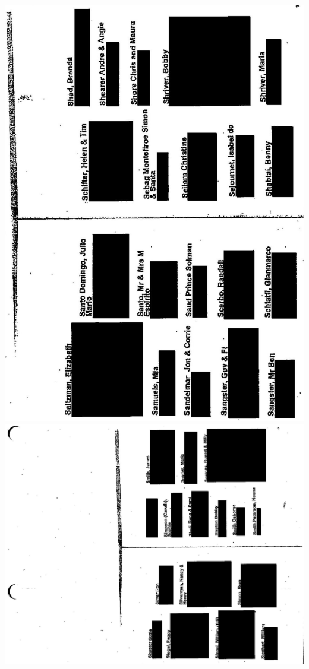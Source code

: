 \documentclass[10pt]{article}
\begin{document}
\includegraphics[max width=\textwidth, center]{2025_02_27_dd68c3d38de88f0516d9g-171}\\
\includegraphics[max width=\textwidth, center]{2025_02_27_dd68c3d38de88f0516d9g-172}\\
\end{document}

